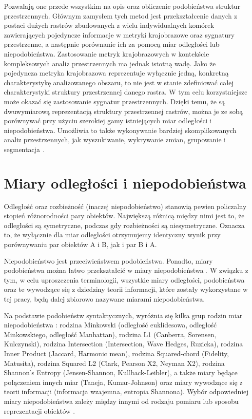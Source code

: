 \documentclass{amuthesis}
\begin{document}
Pozwalają one przede wszystkim na opis oraz obliczenie podobieństwa
struktur przestrzennych. Głównym zamysłem tych metod jest
przekształcenie danych z postaci dużych rastrów zbudowanych z wielu
indywidualnych komórek zawierających pojedyncze informacje w metryki
krajobrazowe oraz sygnatury przestrzenne, a następnie porównanie ich za
pomocą miar odległości lub niepodobieństwa. Zastosowanie metryk
krajobrazowych w kontekście kompleksowych analiz przestrzennych ma
jednak istotną wadę. Jako że pojedyncza metryka krajobrazowa
reprezentuje wyłącznie jedną, konkretną charakterystykę analizowanego
obszaru, to nie jest w stanie zdefiniować całej charakterystyki
struktury przestrzennej danego rastra. W tym celu korzystniejsze może
okazać się zastosowanie sygnatur przestrzennych. Dzięki temu, że są
dwuwymiarową reprezentacją struktury przestrzennej rastrów, można je ze
sobą porównywać przy użyciu szerokiej gamy istniejących miar odległości
i niepodobieństwa. Umożliwia to także wykonywanie bardziej
skomplikowanych analiz przestrzennych, jak wyszukiwanie, wykrywanie
zmian, grupowanie i segmentacja \autocite{nowosad_motif}.

\hypertarget{miary-odlegux142oux15bci-i-niepodobieux144stwa}{%
\section{Miary odległości i
niepodobieństwa}\label{miary-odlegux142oux15bci-i-niepodobieux144stwa}}

Odległość oraz rozbieżność (inaczej niepodobieństwo) stanowią pewien
policzalny stopień różnorodności pary obiektów. Największą różnicą
między nimi jest to, że odległości są symetryczne, podczas gdy
rozbieżności są niesymetryczne. Oznacza to, że wyłącznie dla miar
odległości otrzymujemy identyczny wynik przy porównywaniu par obiektów A
i B, jak i par B i A.

Niepodobieństwo jest przeciwieństwem podobieństwa. Ponadto, miary
podobieństwa można łatwo przekształcić w miary niepodobieństwa
\autocite{niesterowicz2016}. W związku z tym, w celu uproszczenia
terminologii, wszystkie miary odległości, podobieństwa oraz te wywodzące
się z dziedziny teorii informacji, które zostały wykorzystane w tej
pracy, będą dalej zbiorowo nazywane miarami niepodobieństwa.

Na podstawie podobieństw syntaktycznych, wyróżnia się kilka grup rodzin
miar niepodobieństwa \autocite{Cha2007}: rodzina Minkowski (odległość
euklidesowa, odległość Minkowskiego, odległość Manhattan), rodzina L1
(Canberra, Sorensen, Kulczynski), rodzina Intersection (Intersection,
Wave Hedges, Ruzicka), rodzina Inner Product (Jaccard, Harmonic mean),
rodzina Squared-chord (Fidelity, Matusita), rodzina Squared L2 (Clark,
Pearson X2, Neyman X2), rodzina Shannon's Entropy (Jensen-Shannon,
Kullback-Leibler), a także miary będące połączeniem innych miar (Taneja,
Kumar-Johnson) oraz miary wywodzące się z teorii informacji (informacja
wzajemna, entropia Shannona). Wybór odpowiedniej miary niepodobieństwa
zależy między innymi od rodzaju pomiaru lub sposobu reprezentacji
obiektów \autocite{Cha2007}.
\end{document}
